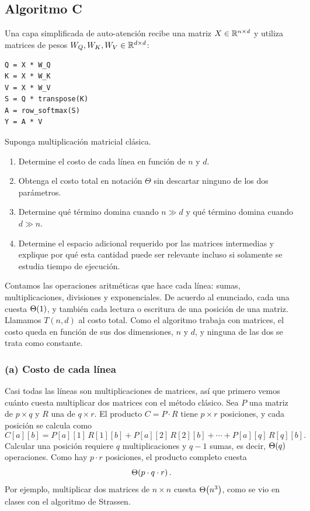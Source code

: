 \subsection{Algoritmo C}
\label{sec:act1c}

\begin{enunciado}
Una capa simplificada de auto-atención recibe una matriz $X \in \mathbb{R}^{n\times d}$ y utiliza
matrices de pesos $W_Q, W_K, W_V \in \mathbb{R}^{d \times d}$:
\begin{lstlisting}[language={}, numbers=none, frame=none, backgroundcolor={}]
Q = X * W_Q
K = X * W_K
V = X * W_V
S = Q * transpose(K)
A = row_softmax(S)
Y = A * V
\end{lstlisting}
Suponga multiplicación matricial clásica.
\begin{enumerate}[label=(\alph*)]
  \item Determine el costo de cada línea en función de $n$ y $d$.
  \item Obtenga el costo total en notación $\Theta$ sin descartar ninguno de los dos
        parámetros.
  \item Determine qué término domina cuando $n \gg d$ y qué término domina cuando
        $d \gg n$.
  \item Determine el espacio adicional requerido por las matrices intermedias y explique
        por qué esta cantidad puede ser relevante incluso si solamente se estudia tiempo
        de ejecución.
\end{enumerate}
\end{enunciado}

Contamos las operaciones aritméticas que hace cada línea: sumas, multiplicaciones,
divisiones y exponenciales. De acuerdo al enunciado, cada una cuesta $\Theta\!\left(1\right)$, y también
cada lectura o escritura de una posición de una matriz. Llamamos $T(n, d)$ al costo total.
Como el algoritmo trabaja con matrices, el costo queda en función de sus dos dimensiones,
$n$ y $d$, y ninguna de las dos se trata como constante.

\subsubsection*{(a) Costo de cada línea}

Casi todas las líneas son multiplicaciones de matrices, así que primero vemos cuánto
cuesta multiplicar dos matrices con el método clásico. Sea $P$ una matriz de $p \times q$
y $R$ una de $q \times r$. El producto $C = P \cdot R$ tiene $p \times r$ posiciones, y
cada posición se calcula como
\[
  C[a][b] = P[a][1]\, R[1][b] + P[a][2]\, R[2][b] + \cdots + P[a][q]\, R[q][b].
\]
Calcular una posición requiere $q$ multiplicaciones y $q - 1$ sumas, es decir, $\Theta\!\left(q\right)$
operaciones. Como hay $p \cdot r$ posiciones, el producto completo cuesta
\[
  \Theta\!\left(p \cdot q \cdot r\right).
\]
Por ejemplo, multiplicar dos matrices de $n \times n$ cuesta $\Theta\!\left(n^3\right)$, como se vio en
clases con el algoritmo de Strassen.

